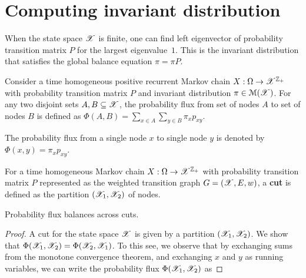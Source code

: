 \documentclass[letterpaper,10pt,english]{article}
\begin{document}
\section{Computing invariant distribution}
When the state space $\mathscr{X}$ is finite, one can find left eigenvector of probability transition matrix $P$ for the largest eigenvalue~$1$. 
This is the invariant distribution that satisfies the global balance equation $\pi = \pi P$. 
\begin{defn} 
Consider a time homogeneous positive recurrent Markov chain $X:\Omega\to\mathscr{X}^{\mathbb{Z}_+}$ with probability transition matrix $P$ and invariant distribution $\pi \in \mathcal{M}(\mathscr{X})$. 
For any two disjoint sets $A, B \subseteq \mathscr{X}$,  
the probability flux from set of nodes $A$ to set of nodes $B$ is defined as $\Phi(A,B) =\sum_{x \in A}\sum_{y \in B}\pi_xp_{xy}$. 
\end{defn}
\begin{rem} 
The probability flux from a single node $x$ to single node $y$ is denoted by $\Phi(x,y) = \pi_xp_{xy}$. 
\end{rem}
\begin{defn} 
For a time homogeneous Markov chain $X:\Omega\to\mathscr{X}^{\mathbb{Z}_+}$ with probability transition matrix $P$ 
represented as the weighted transition graph $G = (\mathscr{X}, E, w)$, 
a \textbf{cut} is defined as the partition $(\mathscr{X}_1,\mathscr{X}_2)$ of nodes.
\end{defn}
\begin{lem}
Probability flux balances across cuts. 
\end{lem}
\begin{proof}
A cut for the state space $\mathscr{X}$ is given by a partition $(\mathscr{X}_1,\mathscr{X}_2)$. 
We show that $\Phi(\mathscr{X}_1,\mathscr{X}_2) = \Phi(\mathscr{X}_2,\mathscr{X}_1)$. 
To this see, we observe that by exchanging sums from the monotone convergence theorem, and exchanging $x$ and $y$ as running variables, we can write the probability flux $\Phi(\mathscr{X}_1,\mathscr{X}_2)$ as 
\end{proof}
\end{document}
